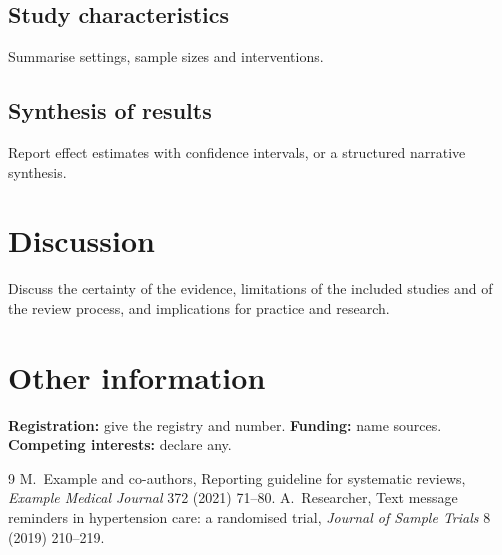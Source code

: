 \documentclass[11pt,a4paper]{article}
\begin{document}
\subsection{Study characteristics}
Summarise settings, sample sizes and interventions.

\subsection{Synthesis of results}
Report effect estimates with confidence intervals, or a structured narrative synthesis.

\section{Discussion}
Discuss the certainty of the evidence, limitations of the included studies and of the review process, and implications for practice and research.

\section{Other information}
\textbf{Registration:} give the registry and number. \textbf{Funding:} name sources. \textbf{Competing interests:} declare any.

\begin{thebibliography}{9}
 M.~Example and co-authors, Reporting guideline for systematic reviews, \emph{Example Medical Journal} 372 (2021) 71--80.
 A.~Researcher, Text message reminders in hypertension care: a randomised trial, \emph{Journal of Sample Trials} 8 (2019) 210--219.
\end{thebibliography}
\end{document}
